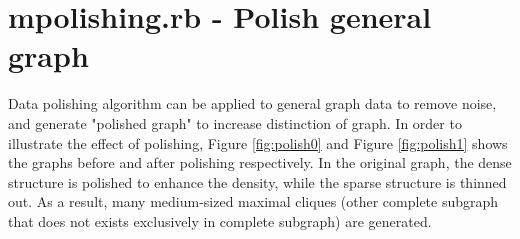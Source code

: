 
\section{mpolishing.rb - Polish general graph\label{sect:mpolishing}}

Data polishing algorithm can be applied to general graph data to remove noise, and generate "polished graph" to increase distinction of graph.  
In order to illustrate the effect of polishing, Figure \ref{fig:polish0} and Figure \ref{fig:polish1} shows the graphs before and after polishing respectively.   
In the original graph, the dense structure is polished to enhance the density, while the sparse structure is thinned out. 
As a result, many medium-sized maximal cliques (other complete subgraph that does not exists exclusively in complete subgraph) are generated. 


